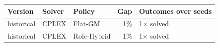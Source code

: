\begin{tabular}{lllrl}
\toprule
Version & Solver & Policy & Gap & Outcomes over seeds \\
\midrule
historical & CPLEX & Flat-GM & 1\% & 1$\times$ solved \\
historical & CPLEX & Role-Hybrid & 1\% & 1$\times$ solved \\
\bottomrule
\end{tabular}
